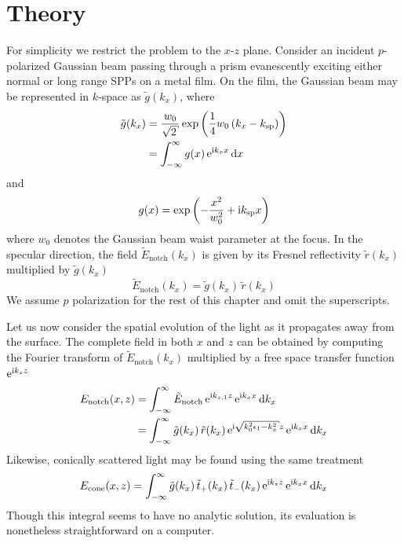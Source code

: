 \section{Theory}
For simplicity we restrict the problem to the $x$-$z$ plane.  Consider an
incident $p$-polarized Gaussian beam passing through a prism evanescently
exciting either normal or long range SPPs on a metal film.  On the film,
the Gaussian beam may be represented in $k$-space as $\tilde{g}(k_x)$,
where
\begin{align}
\tilde{g}(k_x) &= \frac{w_0}{\sqrt{2}} \exp\left(\frac{1}{4}w_0\left(k_x - \ksp\right)\right)\\
&= \intinfty g(x)\, \me^{\mi k_x x} \md x
\end{align}
and
\begin{equation}
g(x) = \exp\left(-\frac{x^2}{w_0^2} + {\mathrm{i}} k_\mathrm{sp} x\right)
\end{equation}
where $w_0$ denotes the Gaussian beam waist parameter at the focus.  In the
specular direction, the field $\tilde{E}_\mathrm{notch}(k_x)$ is given by its
Fresnel reflectivity $\tilde{r}(k_x)$ multiplied by $\tilde{g}(k_x)$
\begin{equation}
\tilde{E}_\mathrm{notch}(k_x)=\tilde{g}(k_x)\,\tilde{r}(k_x)
\end{equation}
We assume $p$ polarization for the rest of this chapter and omit the
superscripts.

Let us now consider the spatial evolution of the light as it propagates
away from the surface.
The complete field in both $x$ and $z$ can be obtained by computing
the Fourier transform of $\tilde{E}_\mathrm{notch}(k_x)$ multiplied 
by a free space transfer function ${\mathrm{e}}^{{\mathrm{i}} k_{z} z}$
\begin{align}
E_\mathrm{notch}(x,z) &= \intinfty \tilde{E}_\mathrm{notch}\, \me^{\mi k_{z,1} z}\, \me^{\mi k_x x} \md k_x\\
 &= \intinfty \tilde{g}(k_x)\, \tilde{r}(k_x)\, \me^{\mi \sqrt{k_0^2 \epsilon_1 - k_x^2}z}\, \me^{\mi k_x x} \md k_x
\label{eqn:fourier123}
\end{align}
Likewise, conically scattered light may be found using the same treatment
\begin{align}
E_\text{cone}(x,z) = \int_{-\infty}^{\infty} \tilde{g}(k_x)\, 
\tilde{t}_+(k_x)\, \tilde{t}_-(k_x)\,{\mathrm{e}}^{{\mathrm{i}} k_z z}\, {\mathrm{e}}^{{\mathrm{i}} k_x x} \,\mathrm{d} k_x
\label{eqn:fourier321}
\end{align}
Though this integral seems to have no analytic solution, its evaluation is
nonetheless straightforward on a computer.

